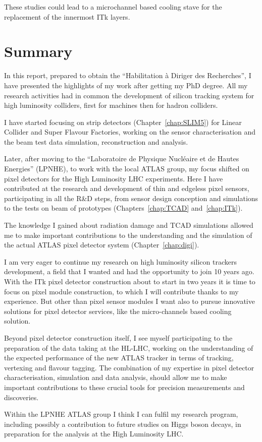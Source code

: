 These studies could lead to a microchannel based cooling stave for the replacement of the innermost 
ITk layers.

\chapter*{Summary}
In this report, prepared  to obtain the  ``Habilitation \`a Diriger des Recherches'', I have 
presented the highlights of my work  after getting my PhD degree. 
All my research activities had in common the development of silicon tracking system for high luminosity 
colliders, first for \epem machines then for hadron colliders. 

I have started focusing on strip detectors (Chapter~\ref{chap:SLIM5}) for Linear Collider and Super 
Flavour Factories, working on the sensor characterisation and the beam test data simulation, 
reconstruction and analysis. 

Later, after moving to the  ``Laboratoire de Physique Nucl\'eaire et de Hautes Energies'' (LPNHE), to 
work with the local ATLAS group, my focus shifted on pixel detectors for the High Luminosity LHC 
experiments. Here I have contributed at the research and development of thin and edgeless 
pixel sensors, participating in all the R\&D steps, from sensor design conception and simulations to 
the tests on beam of prototypes (Chapters~\ref{chap:TCAD} and~\ref{chap:ITk}). 

The knowledge I gained about radiation damage and TCAD simulations allowed me to make important 
contributions to the understanding and the simulation of the actual ATLAS pixel detector system 
(Chapter~\ref{chap:digi}). 

I am very eager to continue my research on high luminosity silicon trackers development, 
a field that I wanted and had the opportunity to join 10 years ago. 
With the ITk pixel detector construction about to start in two years it is time to focus on pixel 
module construction, to which I will contribute thanks to my experience. But other than 
pixel sensor modules I want also to pursue innovative solutions for pixel detector services, 
like the micro-channels based cooling solution.

Beyond pixel detector construction itself, I see myself participating to the preparation of the 
data taking at the HL-LHC, working on the understanding of the expected performance of the 
new ATLAS tracker in terms of tracking, vertexing and flavour tagging. The combination of my 
expertise in pixel detector characterisation, simulation and data analysis, should allow me 
to make important contributions to these crucial tools for precision measurements and discoveries. 

Within the LPNHE ATLAS group I think I can fulfil my research program, including possibly 
a contribution to future studies on Higgs boson decays, in preparation for the analysis 
at the High Luminosity LHC.

